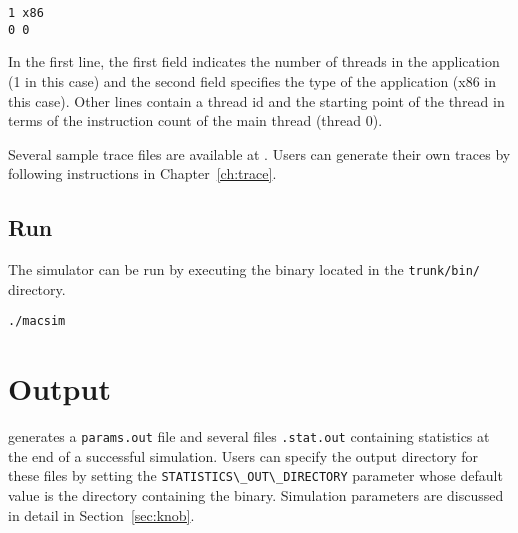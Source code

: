 \begin{Verbatim}
1 x86
0 0
\end{Verbatim}

\noindent In the first line, the first field indicates the number of threads in
the application (1 in this case) and the second field specifies the type of the
application (x86 in this case). Other lines contain a thread id and the starting 
point of the thread in terms of the instruction count of the main thread
(thread 0).


Several sample trace files are available at
. Users can generate their own
traces by following instructions in Chapter~\ref{ch:trace}.


\subsection{Run}

The \SIM simulator can be run by executing the \bin binary located in the
\Verb+trunk/bin/+ directory.

\begin{Verbatim}
./macsim
\end{Verbatim}



\section{Output}

\SIM generates a \Verb+params.out+ file and several files \Verb+.stat.out+
containing statistics at the end of a successful simulation. Users can specify
the output directory for these files by setting the
\Verb+STATISTICS\_OUT\_DIRECTORY+ parameter whose default value is the
directory containing the \bin binary. Simulation parameters are discussed in
detail in Section~\ref{sec:knob}.


